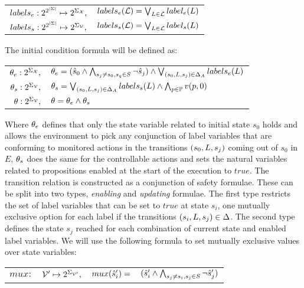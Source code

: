 \begin{center}
	\begin{tabular}{r l}
		$labels_e:2^{2^{|\Sigma|}}\mapsto 2^{\Sigma_{{\mathcal{X}}}},$ &
		$labels_e(\mathcal{L}) = \bigvee_{L \in \mathcal{L}}label_e(L)$\\
		$labels_s:2^{2^{|\Sigma|}}\mapsto 2^{\Sigma_{{\mathcal{V}}}},$ &
		$labels_s(\mathcal{L}) = \bigvee_{L \in \mathcal{L}}label_s(L)$\\
	\end{tabular}
\end{center}


The initial condition formula will be defined as:
\begin{center}
	\begin{tabular}{r l}
		${\theta_e}:2^{\Sigma_{{\mathcal{X}}}},$ &
		${\theta_e} = (\hat{s}_{0} \wedge\bigwedge_{s_j \neq s_0, s_q \in S}\neg \hat{s}_{j})  \wedge \bigvee_{(s_0,L,s_j) \in \Delta_A}labels_e(L)$\\
		${\theta_s}:2^{\Sigma_{{\mathcal{V}}}},$ &
		${\theta_s} = \bigvee_{(s_0,L,s_j) \in \Delta_A}labels_s(L) \wedge \bigwedge_{p \in \mathbb{P}}v(p,0)$\\
		$\theta:2^{\Sigma_{{\mathcal{V}}}},$ &
		$\theta = {\theta_e} \wedge {\theta_s}$\\		
	\end{tabular}
\end{center}

Where ${\theta_e}$ defines that only the state variable related to initial state $s_0$ holds and allows the environment to pick any conjunction of label variables that are conforming to monitored actions in the transitions $(s_0, L, s_j)$ coming out of $s_0$ in $E$, ${\theta_s}$ does the same for the controllable actions and sets the natural variables related to propositions enabled at the start of the execution to $true$.
The transition relation is constructed as a conjunction of safety formulae. These can be split into two types, \emph{enabling} and \emph{updating} formulae. The first type restricts the set of label variables that can be set to $true$ at state $s_i$, one mutually exclusive option for each label \actionLabel if the transitions $(s_i,L,s_j) \in \Delta$. The second type defines the state $s_j$ reached for each combination of current state and enabled label variables. 
We will use the following formula to set mutually exclusive values over state variables:

\begin{center}
	\begin{tabular}{r r r l}
$mux:$&${\mathcal{V}}' \mapsto 2^{\Sigma_{{\mathcal{V}}'}},$&$mux(\hat{s}_{i}') = $&$(\hat{s}_{i}' \wedge\bigwedge_{s_j \neq s_i, s_j \in S}\neg \hat{s}_{j}')$
	\end{tabular}
\end{center}

